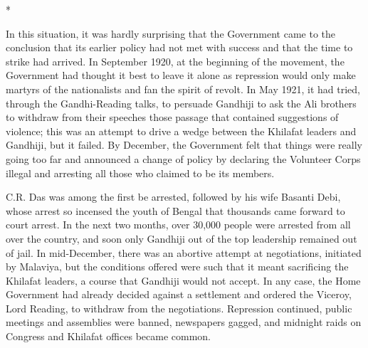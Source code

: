 \begin{center}*\end{center}



In this situation, it was hardly surprising that the Government came to the conclusion that its earlier policy had not met with success and that the time to strike had arrived. In September 1920, at the beginning of the movement, the Government had thought it best to leave it alone as repression would only make martyrs of the nationalists and fan the spirit of revolt. In May 1921, it had tried, through the Gandhi-Reading talks, to persuade Gandhiji to ask the Ali brothers to withdraw from their speeches those passage that contained suggestions of violence; this was an attempt to drive a wedge between the Khilafat leaders and Gandhiji, but it failed. By December, the Government felt that things were really going too far and announced a change of policy by declaring the Volunteer Corps illegal and arresting all those who claimed to be its members. 

C.R. Das was among the first be arrested, followed by his wife Basanti Debi, whose arrest so incensed the youth of Bengal that thousands came forward to court arrest. In the next two months, over 30,000 people were arrested from all over the country, and soon only Gandhiji out of the top leadership remained out of jail. In mid-December, there was an abortive attempt at negotiations, initiated by Malaviya, but the conditions offered were such that it meant sacrificing the Khilafat leaders, a course that Gandhiji would not accept. In any case, the Home Government had already decided against a settlement and ordered the Viceroy, Lord Reading, to withdraw from the negotiations. Repression continued, public meetings and assemblies were banned, newspapers gagged, and midnight raids on Congress and Khilafat offices became common. 

